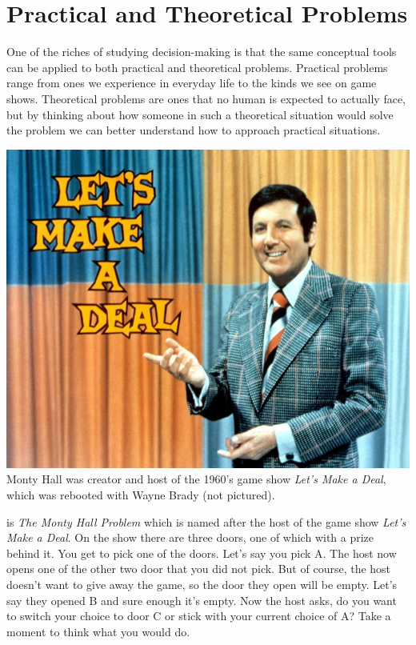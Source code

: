 \documentclass[]{tufte-book}
\begin{document}
\hypertarget{practical-and-theoretical-problems}{%
\section{Practical and Theoretical Problems}\label{practical-and-theoretical-problems}}

One of the riches of studying decision-making is that the same conceptual tools can be applied to both practical and theoretical problems. Practical problems range from ones we experience in everyday life to the kinds we see on game shows. Theoretical problems are ones that no human is expected to actually face, but by thinking about how someone in such a theoretical situation would solve the problem we can better understand how to approach practical situations.

\begin{marginfigure}
\includegraphics{img/lets_make_a_deal.png} Monty Hall was creator and
host of the 1960's game show \emph{Let's Make a Deal}, which was
rebooted with Wayne Brady (not pictured).
\end{marginfigure}

 is \emph{The Monty Hall Problem} which is named after the host of the game show \emph{Let's Make a Deal}. On the show there are three doors, one of which with a prize behind it. You get to pick one of the doors. Let's say you pick A. The host now opens one of the other two door that you did not pick. But of course, the host doesn't want to give away the game, so the door they open will be empty. Let's say they opened B and sure enough it's empty. Now the host asks, do you want to switch your choice to door C or stick with your current choice of A? Take a moment to think what you would do.
\end{document}
